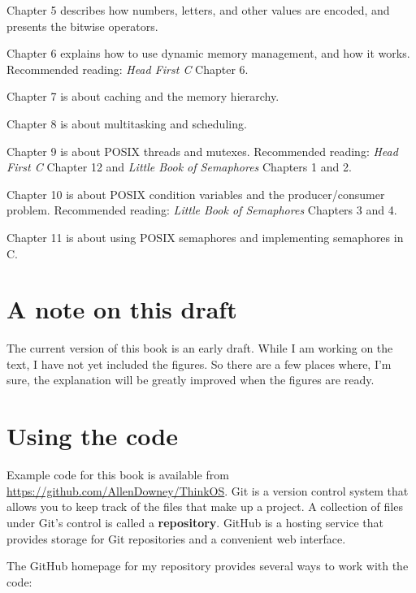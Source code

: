 \documentclass[12pt]{book}
\begin{document}
Chapter 5 describes how numbers, letters, and other values are
encoded, and presents the bitwise operators.

Chapter 6 explains how to use dynamic memory management, and how
it works.
Recommended reading: {\it Head First C} Chapter 6.

Chapter 7 is about caching and the memory hierarchy.

Chapter 8 is about multitasking and scheduling.

Chapter 9 is about POSIX threads and mutexes.
Recommended reading: {\it Head First C} Chapter 12 and
{\it Little Book of Semaphores} Chapters 1 and 2.

Chapter 10 is about POSIX condition variables and the producer/consumer
problem. Recommended reading: {\it Little Book of Semaphores} Chapters 3
and 4.

Chapter 11 is about using POSIX semaphores and implementing semaphores in C.

\section*{A note on this draft}

The current version of this book is an early draft.  While I am
working on the text, I have not yet included the figures.  So
there are a few places where, I'm sure, the explanation will be
greatly improved when the figures are ready.


\section{Using the code}
\label{code}

Example code for this book is available from
\url{https://github.com/AllenDowney/ThinkOS}.  Git is a version
control system that allows you to keep track of the files that
make up a project.  A collection of files under Git's control is
called a {\bf repository}.  GitHub is a hosting service that provides
storage for Git repositories and a convenient web interface.

The GitHub homepage for my repository provides several ways to
work with the code:
\end{document}
